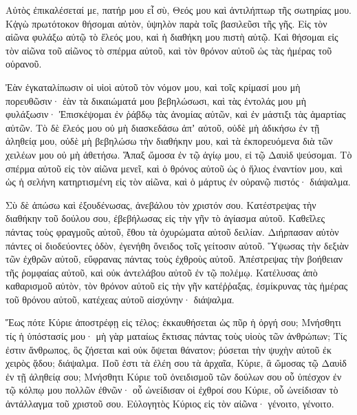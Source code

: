 {Αὐτὸς ἐπικαλέσεταί με, πατήρ μου εἶ σὺ, Θεός μου καὶ ἀντιλήπτωρ τῆς σωτηρίας μου.
Κᾀγὼ πρωτότοκον θήσομαι αὐτὸν, ὑψηλὸν παρὰ τοῖς βασιλεῦσι τῆς γῆς.
Εἰς τὸν αἰῶνα φυλάξω αὐτῷ τὸ ἔλεός μου, καὶ ἡ διαθήκη μου πιστὴ αὐτῷ.
Καὶ θήσομαι εἰς τὸν αἰῶνα τοῦ αἰῶνος τὸ σπέρμα αὐτοῦ, καὶ τὸν θρόνον αὐτοῦ ὡς τὰς ἡμέρας τοῦ οὐρανοῦ.
\par }{\PP {}Ἐὰν ἐγκαταλίπωσιν οἱ υἱοὶ αὐτοῦ τὸν νόμον μου, καὶ τοῖς κρίμασί μου μὴ πορευθῶσιν·
ἐὰν τὰ δικαιώματά μου βεβηλώσωσι, καὶ τὰς ἐντολάς μου μὴ φυλάξωσιν·
Ἐπισκέψομαι ἐν ῥάβδῳ τὰς ἀνομίας αὐτῶν, καὶ ἐν μάστιξι τὰς ἁμαρτίας αὐτῶν.
Τὸ δὲ ἔλεός μου οὐ μὴ διασκεδάσω ἀπʼ αὐτοῦ, οὐδὲ μὴ ἀδικήσω ἐν τῇ ἀληθείᾳ μου,
οὐδὲ μὴ βεβηλώσω τὴν διαθήκην μου, καὶ τὰ ἐκπορευόμενα διὰ τῶν χειλέων μου οὐ μὴ ἀθετήσω.
Ἅπαξ ὤμοσα ἐν τῷ ἁγίῳ μου, εἰ τῷ Δαυὶδ ψεύσομαι.
Τὸ σπέρμα αὐτοῦ εἰς τὸν αἰῶνα μενεῖ, καὶ ὁ θρόνος αὐτοῦ ὡς ὁ ἥλιος ἐναντίον μου,
καὶ ὡς ἡ σελήνη κατηρτισμένη εἰς τὸν αἰῶνα, καὶ ὁ μάρτυς ἐν οὐρανῷ πιστός· διάψαλμα.
\par }{\PP {}Σὺ δὲ ἀπώσω καὶ ἐξουδένωσας, ἀνεβάλου τὸν χριστόν σου.
Κατέστρεψας τὴν διαθήκην τοῦ δούλου σου, ἐβεβήλωσας εἰς τὴν γῆν τὸ ἁγίασμα αὐτοῦ.
Καθεῖλες πάντας τοὺς φραγμοῦς αὐτοῦ, ἔθου τὰ ὀχυρώματα αὐτοῦ δειλίαν.
Διήρπασαν αὐτὸν πάντες οἱ διοδεύοντες ὁδὸν, ἐγενήθη ὄνειδος τοῖς γείτοσιν αὐτοῦ.
Ὕψωσας τὴν δεξιὰν τῶν ἐχθρῶν αὐτοῦ, εὔφρανας πάντας τοὺς ἐχθροὺς αὐτοῦ.
Ἀπέστρεψας τὴν βοήθειαν τῆς ῥομφαίας αὐτοῦ, καὶ οὐκ ἀντελάβου αὐτοῦ ἐν τῷ πολέμῳ.
Κατέλυσας ἀπὸ καθαρισμοῦ αὐτὸν, τὸν θρόνον αὐτοῦ εἰς τὴν γῆν κατέῤῥαξας,
ἐσμίκρυνας τὰς ἡμέρας τοῦ θρόνου αὐτοῦ, κατέχεας αὐτοῦ αἰσχύνην· διάψαλμα.
\par }{\PP {}Ἕως πότε Κύριε ἀποστρέφῃ εἰς τέλος; ἐκκαυθήσεται ὡς πῦρ ἡ ὀργή σου;
Μνήσθητι τίς ἡ ὑπόστασίς μου· μὴ γὰρ ματαίως ἔκτισας πάντας τοὺς υἱοὺς τῶν ἀνθρώπων;
Τίς ἐστιν ἄνθρωπος, ὃς ζήσεται καὶ οὐκ ὄψεται θάνατον; ῥύσεται τὴν ψυχὴν αὐτοῦ ἐκ χειρὸς ᾅδου; διάψαλμα.
Ποῦ ἐστι τὰ ἐλέη σου τὰ ἀρχαῖα, Κύριε, ἃ ὤμοσας τῷ Δαυὶδ ἐν τῇ ἀληθείᾳ σου;
Μνήσθητι Κύριε τοῦ ὀνειδισμοῦ τῶν δούλων σου οὗ ὑπέσχον ἐν τῷ κόλπῳ μου πολλῶν ἐθνῶν·
οὗ ὠνείδισαν οἱ ἐχθροί σου Κύριε, οὗ ὠνείδισαν τὸ ἀντάλλαγμα τοῦ χριστοῦ σου.
Εὐλογητὸς Κύριος εἰς τὸν αἰῶνα· γένοιτο, γένοιτο.

}
